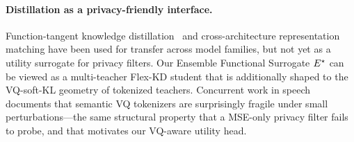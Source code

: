 \paragraph{Distillation as a privacy-friendly interface.} Function-tangent knowledge distillation~\citep{flex_kd} and cross-architecture representation matching have been used for transfer across model families, but not yet as a utility surrogate for privacy filters. Our Ensemble Functional Surrogate $E^{\star}$ can be viewed as a multi-teacher Flex-KD student that is additionally shaped to the VQ-soft-KL geometry of tokenized teachers. Concurrent work in speech~\citep{stabletoken} documents that semantic VQ tokenizers are surprisingly fragile under small perturbations---the same structural property that a MSE-only privacy filter fails to probe, and that motivates our VQ-aware utility head.
